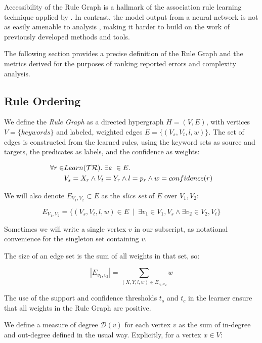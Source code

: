 Accessibility of the Rule Graph is a hallmark of the association rule
learning technique applied by \app \cite{someOtherGraphStuff}.
In contrast, the model output from a neural network is not as easily 
amenable to analysis \cite{nnAnalysis1, nnAnalysis2}, making it harder
to build on the work of previously developed methods and tools.

The following section provides a precise definition of the Rule Graph
and the metrics derived for the purposes of ranking reported errors
and complexity analysis.

\subsection{Rule Ordering}
\label{sec:ruleorder}

We define the \textit{Rule Graph} as a directed hypergraph $H = (V,E)$,
   with vertices $V = \{ keywords \}$ and labeled, weighted edges $E = \{ (V_s, V_t, l, w) \}$.
The set of edges is constructed from the learned rules, using the keyword sets as source and targets, the predicates as labels, and the confidence as weights:

\begin{align*}
\forall r \in & Learn(\mathcal{TR}).\ \exists e\ \in E.\\
              & V_s = X_r \land V_t=Y_r \land l=p_r \land w = confidence(r)
\end{align*}

We will also denote $E_{V_1, V_2} \subset E$ as the \textit{slice set} of $E$ over $V_1, V_2$: 

    $$E_{V_1, V_2} = \{ \left( V_s, V_t, l, w \right) \in E \ \mid \ \exists v_1 \in V_1, V_s \land \exists v_2 \in V_2, V_t \}$$

Sometimes we will write a single vertex $v$ in our subscript, as
notational convenience for the singleton set containing $v$.

The size of an edge set is the sum of all weights in that set, so:

    $$|E_{v_1, v_2}| = \sum_{(X, Y, l, w) \in E_{v_1, v_2}} w$$

The use of the support and confidence thresholds $t_s$ and $t_c$ in the learner ensure 
that all weights in the Rule Graph are positive.

We define a measure of degree $\mathcal{D}(v)$ for each vertex $v$ as the sum of in-degree
and out-degree defined in the usual way. Explicitly, for a vertex $x \in V$:

